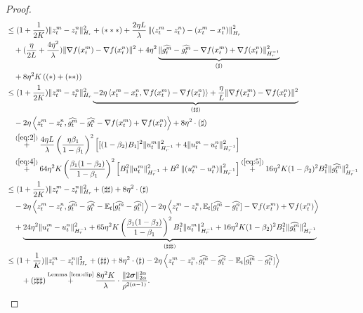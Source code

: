 \documentclass{article} %
\numberwithin{equation}{section}
\renewcommand{\eqref}[1]{(\ref{#1})}
\begin{document}
\begin{proof}
\begin{equation}
\begin{aligned}
            &\leq (1+\frac{1}{2K})\|z_t^m-z_t^n\|_{H_r}^2 + (***) + \frac{2\eta L}{\lambda}\left\| (z_t^m-z_t^n)-(x_t^m-x_t^n) \right\|_{H_r}^2\\
            &\quad + (\frac{\eta}{2L}+\frac{4\eta^2}{\lambda}) \|\nabla f(x_t^m)-\nabla f(x_t^n)\|^2 + 4\eta^2\underbrace{\|\widehat{g_t^m}-\widehat{g_t^m}-\nabla f(x_t^m)+\nabla f(x_t^n)\|_{H_r^{-1}}^2}_{(\sharp)}\\
            &\quad + 8\eta^2K \left((*)+(**)\right) \\
            &\leq (1+\frac{1}{2K})\|z_t^m-z_t^n\|_{H_r}^2 \underbrace{- 2\eta \left\langle x_t^m-x_t^n, \nabla f(x_t^m)-\nabla f(x_t^n)\right\rangle + \frac{\eta}{L} \|\nabla f(x_t^m)-\nabla f(x_t^n)\|^2}_{(\sharp\sharp)} \\
            &\quad -2\eta \left\langle z_t^m-z_t^n, \widehat{g_t^m}-\widehat{g_t^n}-\nabla f(x_t^m)+\nabla f(x_t^n)\right\rangle + 8\eta^2\cdot (\sharp)\\
            &\quad \overset{\eqref{eq:2}}{+} \frac{4\eta L}{\lambda}\left(\frac{\eta\beta_1}{1-\beta_1}\right)^2 \left[ [(1-\beta_2)B_1]^2\|u_t^m\|_{H_r^{-1}}^2 + 4\|u_t^m-u_t^n \|_{H_r^{-1}}^2\right] \\
            &\quad \overset{\eqref{eq:4}}{+} 64\eta^2K\left(\frac{\beta_1(1-\beta_2)}{1-\beta_1}\right)^2\left[ B_1^2\|u_t^m\|_{H_r^{-1}}^2 +B^2\left\|(u_t^m-u_t^n)\right\|_{H_r^{-1}}^2\right] \overset{\eqref{eq:5}}{+} 16\eta^2K(1-\beta_2)^2B_1^2\|\widehat{g_t^m}\|_{H_r^{-1}}^2 \\
            &\leq (1+\frac{1}{2K})\|z_t^m-z_t^n\|_{H_r}^2 + (\sharp\sharp) + 8\eta^2\cdot(\sharp)\\
            &\quad -2\eta \left\langle z_t^m-z_t^n, \widehat{g_t^m}-\widehat{g_t^n}-\expect_t[\widehat{g_t^m}-\widehat{g_t^n}] \right\rangle - 2\eta \left\langle z_t^m-z_t^n, \expect_t[\widehat{g_t^m}-\widehat{g_t^n}]-\nabla f(x_t^m)+\nabla f(x_t^n)\right\rangle \\
            &\quad + \underbrace{24\eta^2 \|u_t^m-u_t^n \|_{H_r^{-1}}^2 + 65\eta^2K\left(\frac{\beta_1(1-\beta_2)}{1-\beta_1}\right)^2B_1^2\|u_t^m\|_{H_r^{-1}}^2 + 16\eta^2K(1-\beta_2)^2B_1^2\|\widehat{g_t^m}\|_{H_r^{-1}}^2}_{(\sharp\sharp\sharp)} \\
            &\leq (1+\frac{1}{K})\|z_t^m-z_t^n\|_{H_r}^2 + (\sharp\sharp) + 8\eta^2\cdot (\sharp) -2\eta \left\langle z_t^m-z_t^n, \widehat{g_t^m}-\widehat{g_t^n}-\expect_t[\widehat{g_t^m}-\widehat{g_t^n}]\right\rangle\\
            &\qquad + (\sharp\sharp\sharp) \overset{\text{Lemma \ref{lem:clip}}}{+} \frac{8\eta^2K}{\lambda}\cdot \frac{\|2\boldsymbol{\sigma}\|_{2\alpha}^{2\alpha}}{\rho^{2(\alpha-1)}}.

\end{aligned}
\end{equation}
\end{proof}
\end{document}
